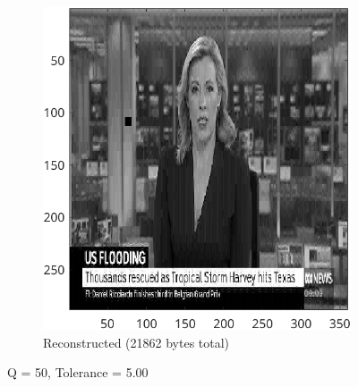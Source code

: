 \documentclass{article}
\begin{document}
\begin{figure}[ht]
\begin{subfigure}[t]{0.45\textwidth}
			\includegraphics[width=\textwidth]{2B_Input3Reconstructed}

			\caption{Reconstructed (21862 bytes total)}
			\label{fig:2B_Input3Reconstructed}

		\end{subfigure}

		\caption{Q = 50, Tolerance = 5.00}
		\label{fig:2B_Input3}
	\end{figure}
\end{document}
